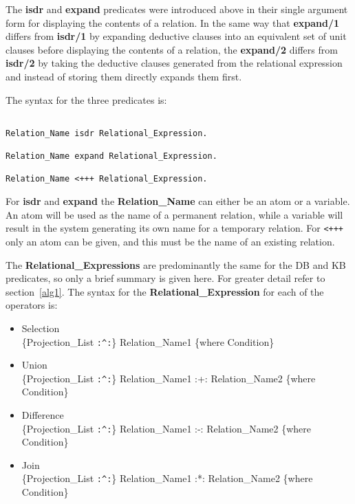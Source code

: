 The {\bf isdr} and {\bf expand} predicates were introduced
above in their single argument form for displaying 
the contents of a relation. In the same way that {\bf expand/1}
differs from {\bf isdr/1} by expanding deductive clauses
into an equivalent set of unit clauses before displaying the
contents of a relation, 
the {\bf expand/2} differs from {\bf isdr/2} by
taking the deductive clauses generated from the relational expression
and instead of storing them directly expands them first.


The syntax for the three predicates is:

\begin{verbatim}

Relation_Name isdr Relational_Expression.

Relation_Name expand Relational_Expression.

Relation_Name <+++ Relational_Expression.

\end{verbatim}

For {\bf isdr} and {\bf expand} the {\bf Relation\_Name} can either
be an atom or a variable.  An atom will be used as the name of
a permanent relation, while a variable will result in the system
generating its own name for a temporary relation.
For \verb-<+++- only an atom can be given,
and this must be the name of an existing relation.

The {\bf Relational\_Expressions} are predominantly the same for the
DB and KB predicates, so only a brief summary is given here.  For
greater detail refer to section~\ref{alg1}.  The syntax for the 
{\bf Relational\_Expression} for each of the operators is:
 
\begin{itemize}
\item{Selection}\\
     \{Projection\_List \verb+:^:+\} Relation\_Name1 \{where Condition\}
\item{Union}\\
     \{Projection\_List \verb+:^:+\} Relation\_Name1 :+: Relation\_Name2 
                                                \{where Condition\} 
\item{Difference}\\
     \{Projection\_List \verb+:^:+\} Relation\_Name1 :-: Relation\_Name2
                                                \{where Condition\}  
\item{Join}\\
     \{Projection\_List \verb+:^:+\} Relation\_Name1 :*: Relation\_Name2   
                                               \{where Condition\}
\end{itemize}

